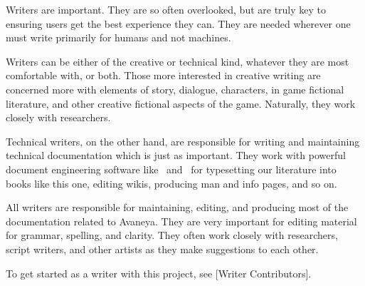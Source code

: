 
Writers are important. They are so often overlooked, but are truly key to ensuring users get the best experience they can. They are needed wherever one must write primarily for humans and not machines. 

Writers can be either of the creative or technical kind, whatever they are most comfortable with, or both. Those more interested in creative writing are concerned more with elements of story, dialogue, characters, in game fictional literature, and other creative fictional aspects of the game. Naturally, they work closely with researchers.

Technical writers, on the other hand, are responsible for writing and maintaining technical documentation which is just as important. They work with powerful document engineering software like \BIBTEX\ and \CONTEXT\ for typesetting our literature into books like this one, editing wikis, producing man and info pages, and so on.

All writers are responsible for maintaining, editing, and producing most of the documentation related to Avaneya. They are very important for editing material for grammar, spelling, and clarity. They often work closely with researchers, script writers, and other artists as they make suggestions to each other. 

To get started as a writer with this project, see [Writer Contributors].

\StopChapter
